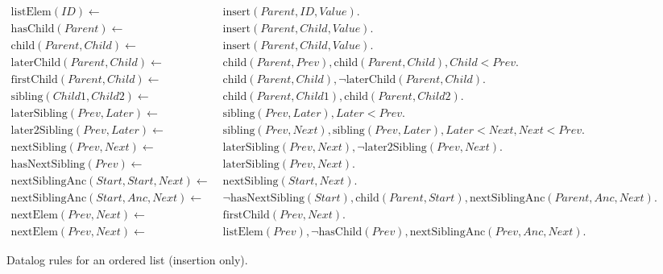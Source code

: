 \documentclass[twocolumn,10pt]{article}
\begin{document}
\begin{figure*}
\begin{align*}
    \mathrm{listElem}(\mathit{ID}) \leftarrow\; &
    \mathrm{insert}(\mathit{Parent}, \mathit{ID}, \mathit{Value}).
\\
    \mathrm{hasChild}(\mathit{Parent}) \leftarrow\; &
    \mathrm{insert}(\mathit{Parent}, \mathit{Child}, \mathit{Value}).
\\
    \mathrm{child}(\mathit{Parent}, \mathit{Child}) \leftarrow\; &
    \mathrm{insert}(\mathit{Parent}, \mathit{Child}, \mathit{Value}).
\\
    \mathrm{laterChild}(\mathit{Parent}, \mathit{Child}) \leftarrow\; &
    \mathrm{child}(\mathit{Parent}, \mathit{Prev}),
    \mathrm{child}(\mathit{Parent}, \mathit{Child}),
    \mathit{Child} < \mathit{Prev}.
\\
    \mathrm{firstChild}(\mathit{Parent}, \mathit{Child}) \leftarrow\; &
    \mathrm{child}(\mathit{Parent}, \mathit{Child}),
    \neg\mathrm{laterChild}(\mathit{Parent}, \mathit{Child}).
\\
    \mathrm{sibling}(\mathit{Child1}, \mathit{Child2}) \leftarrow\; &
    \mathrm{child}(\mathit{Parent}, \mathit{Child1}),
    \mathrm{child}(\mathit{Parent}, \mathit{Child2}).
\\
    \mathrm{laterSibling}(\mathit{Prev}, \mathit{Later}) \leftarrow\; &
    \mathrm{sibling}(\mathit{Prev}, \mathit{Later}),
    \mathit{Later} < \mathit{Prev}.
\\
    \mathrm{later2Sibling}(\mathit{Prev}, \mathit{Later}) \leftarrow\; &
    \mathrm{sibling}(\mathit{Prev}, \mathit{Next}),
    \mathrm{sibling}(\mathit{Prev}, \mathit{Later}),
    \mathit{Later} < \mathit{Next},
    \mathit{Next} < \mathit{Prev}.
\\
    \mathrm{nextSibling}(\mathit{Prev}, \mathit{Next}) \leftarrow\; &
    \mathrm{laterSibling}(\mathit{Prev}, \mathit{Next}),
    \neg\mathrm{later2Sibling}(\mathit{Prev}, \mathit{Next}).
\\
    \mathrm{hasNextSibling}(\mathit{Prev}) \leftarrow\; &
    \mathrm{laterSibling}(\mathit{Prev}, \mathit{Next}).
\\
    \mathrm{nextSiblingAnc}(\mathit{Start}, \mathit{Start}, \mathit{Next}) \leftarrow\; &
    \mathrm{nextSibling}(\mathit{Start}, \mathit{Next}).
\\
    \mathrm{nextSiblingAnc}(\mathit{Start}, \mathit{Anc}, \mathit{Next}) \leftarrow\; &
    \neg\mathrm{hasNextSibling}(\mathit{Start}),
    \mathrm{child}(\mathit{Parent}, \mathit{Start}),
    \mathrm{nextSiblingAnc}(\mathit{Parent}, \mathit{Anc}, \mathit{Next}).
\\
    \mathrm{nextElem}(\mathit{Prev}, \mathit{Next}) \leftarrow\; &
    \mathrm{firstChild}(\mathit{Prev}, \mathit{Next}).
\\
    \mathrm{nextElem}(\mathit{Prev}, \mathit{Next}) \leftarrow\; &
    \mathrm{listElem}(\mathit{Prev}),
    \neg\mathrm{hasChild}(\mathit{Prev}),
    \mathrm{nextSiblingAnc}(\mathit{Prev}, \mathit{Anc}, \mathit{Next}).
\end{align*}
\caption{Datalog rules for an ordered list (insertion only).}
\end{figure*}

{\footnotesize

{}}
\end{document}
